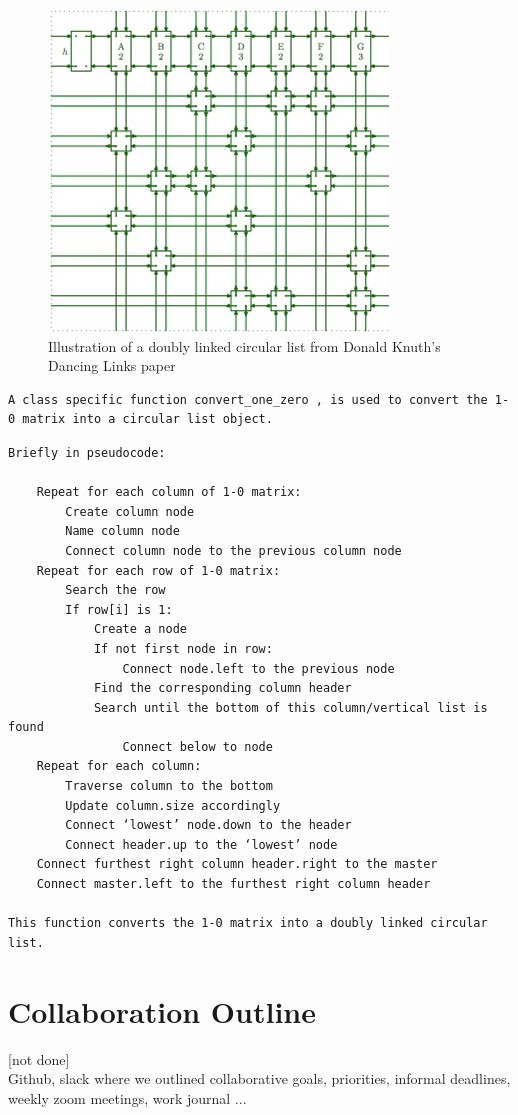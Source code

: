 \documentclass{article}
\begin{document}
 \begin{figure}[ht]
\centering
\includegraphics[scale=0.7]{images/chess4.png}
\caption{Illustration of a doubly linked circular list from Donald Knuth's Dancing Links paper}
\label{fig: Illustration of a doubly linked circular list from Donald Knuth's Dancing Links paper}
\end{figure}


\begin{verbatim}
A class specific function convert_one_zero , is used to convert the 1-0 matrix into a circular list object.
\end{verbatim}
\begin{verbatim}
Briefly in pseudocode:

	Repeat for each column of 1-0 matrix:
		Create column node
		Name column node
		Connect column node to the previous column node
	Repeat for each row of 1-0 matrix:
		Search the row
		If row[i] is 1:
			Create a node
			If not first node in row:
				Connect node.left to the previous node
			Find the corresponding column header
			Search until the bottom of this column/vertical list is found
				Connect below to node
	Repeat for each column:
		Traverse column to the bottom
		Update column.size accordingly
		Connect ‘lowest’ node.down to the header
		Connect header.up to the ‘lowest’ node	
	Connect furthest right column header.right to the master
	Connect master.left to the furthest right column header

This function converts the 1-0 matrix into a doubly linked circular list.
\end{verbatim}


\section{Collaboration Outline}
[not done]\\
Github, 
slack where we outlined collaborative goals, priorities, informal deadlines, 
weekly zoom meetings, 
work journal
...
\clearpage
\end{document}

